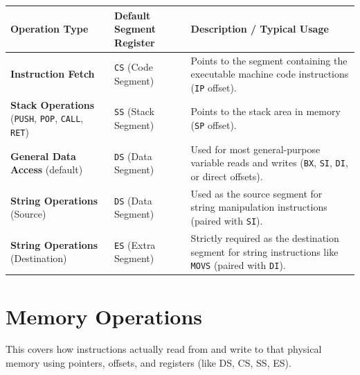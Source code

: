 \begin{longtable}[]{@{}
  >{\raggedright\arraybackslash}p{}
  >{\raggedright\arraybackslash}p{}
  >{\raggedright\arraybackslash}p{}@{}}
\toprule\noalign{}
\begin{minipage}[b]{\linewidth}\raggedright
Operation Type
\end{minipage} & \begin{minipage}[b]{\linewidth}\raggedright
Default Segment Register
\end{minipage} & \begin{minipage}[b]{\linewidth}\raggedright
Description / Typical Usage
\end{minipage} \\
\midrule\noalign{}
\endhead
\bottomrule\noalign{}
\endlastfoot
\textbf{Instruction Fetch} & \texttt{CS} (Code Segment) & Points to the segment containing the executable machine code instructions (\texttt{IP} offset). \\
\textbf{Stack Operations} (\texttt{PUSH}, \texttt{POP}, \texttt{CALL}, \texttt{RET}) & \texttt{SS} (Stack Segment) & Points to the stack area in memory (\texttt{SP} offset). \\
\textbf{General Data Access} (default) & \texttt{DS} (Data Segment) & Used for most general-purpose variable reads and writes (\texttt{BX}, \texttt{SI}, \texttt{DI}, or direct offsets). \\
\textbf{String Operations} (Source) & \texttt{DS} (Data Segment) & Used as the source segment for string manipulation instructions (paired with \texttt{SI}). \\
\textbf{String Operations} (Destination) & \texttt{ES} (Extra Segment) & Strictly required as the destination segment for string instructions like \texttt{MOVS} (paired with \texttt{DI}). \\
\end{longtable}

\section{Memory Operations}

This covers how instructions actually read from and write to that physical
memory using pointers, offsets, and registers (like DS, CS, SS, ES).

